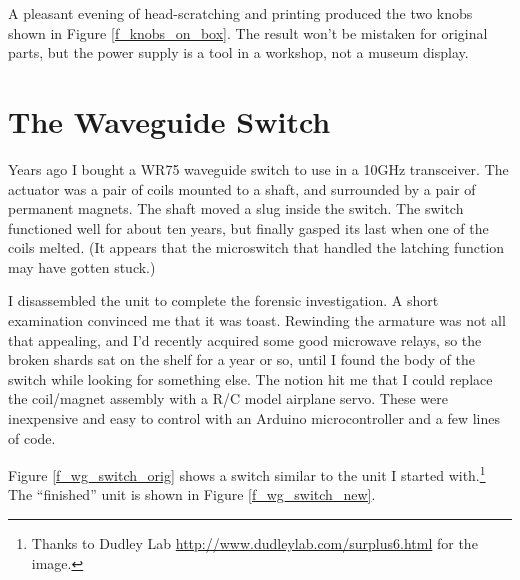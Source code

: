 \documentclass[12pt]{article}
\begin{document}
A pleasant evening of head-scratching and printing produced the two
knobs shown in Figure \ref{f_knobs_on_box}.  The result won't be
mistaken for original parts, but the power supply is a tool in a
workshop, not a museum display.

\section{The Waveguide Switch}

Years ago I bought a WR75 waveguide switch to use in a 10GHz transceiver.
The actuator was a pair of coils mounted to a shaft, and surrounded by
a pair of permanent magnets.  The shaft moved a slug inside the switch.
The switch functioned well for about ten years, but finally gasped its last
when one of the coils melted. (It appears that the microswitch that
handled the latching function may have gotten stuck.)

I disassembled the unit to complete the forensic investigation.  A short
examination convinced me that it was toast.  Rewinding the armature was
not all that appealing, and I'd recently acquired some good microwave relays,
so the broken shards sat on the shelf for a year or so, until I found the body
of the switch while looking for something else. The notion hit me that I
could replace the coil/magnet assembly with a R/C model airplane servo.
These were inexpensive and easy to control with an Arduino microcontroller
and a few lines of code.

Figure \ref{f_wg_switch_orig} shows a switch similar to the unit I started
with.\footnote{Thanks to Dudley Lab \url{http://www.dudleylab.com/surplus6.html} for the image.}  
The ``finished'' unit is shown in Figure \ref{f_wg_switch_new}. 
\end{document}
